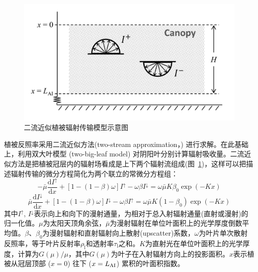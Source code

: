 {
  \begin{figure}[htbp]
    \centering
    \includegraphics[width=0.7\columnwidth]{Figures/辐射过程及辐射通量计算/二流近似模型示意图.png}
    \caption{二流近似植被辐射传输模型示意图}
    \label{fig:二流近似模型示意图}
  \end{figure}
}
植被反照率采用二流近似方法(two-stream approximation，\citet{dickinson1983land,sellers1985canopy}) 进行求解。在此基础上，利用双大叶模型 (two-big-leaf model) \citep{dai2004two} 对阴阳叶分别计算辐射吸收量。二流近似方法是把植被冠层内的辐射场看成是上下两个辐射流组成(图~\ref{fig:二流近似模型示意图})，这样可以把描述辐射传输的微分方程简化为两个联立的常微分方程组：
\begin{equation}\label{di_dx1}
  -\bar{\mu} \frac{{\mathrm d} I^{\uparrow}}{{\mathrm d} x}+\left[1-(1-\beta) \omega\right] I^{\uparrow}-\omega \beta I^{\downarrow}=\omega \bar{\mu} K \beta_{0} \exp (-K x)
\end{equation}
\begin{equation}\label{di_dx2}
  \bar{\mu} \frac{{\mathrm d} I^{\downarrow}}{{\mathrm d} x}+\left[1-(1-\beta) \omega\right] I^{\downarrow}-\omega \beta I^{\uparrow}=\omega \bar{\mu} K\left(1-\beta_{0}\right) \exp (-K x)
\end{equation}
其中$I^{\uparrow}$, $I^{\downarrow}$表示向上和向下的漫射通量，为相对于总入射辐射通量(直射或漫射)的归一化值。$\mu$为太阳天顶角余弦，$\bar{\mu}$为漫射辐射在单位叶面积上的光学厚度倒数平均值。$\beta$、$\beta_{0}$为漫射辐射和直射辐射向上散射(upscatter)系数，$\omega$为叶片单次散射反照率，等于叶片反射率$\rho_{\mathrm{l}}$和透射率$\tau_{\mathrm{l}}$之和。$K$为直射光在单位叶面积上的光学厚度，计算为$G(\mu) / \mu$，其中$G(\mu)$为叶子在入射辐射方向上的投影面积。$x$表示植被从冠层顶部 ($x=0$) 往下 ($x=L_{\rm AI}$) 累积的叶面积指数。

